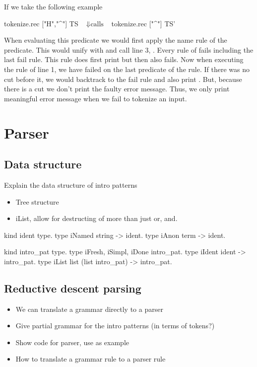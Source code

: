 \documentclass[thesis.tex]{subfiles}
\begin{document}
{If we take the following example
\begin{elpicode}
  tokenize.rec ["H","^"] TS
              ~$\Downarrow \text{calls}$~ 
  tokenize.rec ["^"] TS'
\end{elpicode}
When evaluating this predicate we would first apply the name rule of the  predicate. This would unify  with \elpiinline{[tName "H" | TS']} and call line 3, . Every rule of  fails including the last fail rule. This rule does first print  but then also fails. Now when executing the rule of line 1, we have failed on the last predicate of the rule. If there was no cut before it, we would backtrack to the fail rule and also print . But, because there is a cut we don't print the faulty error message. Thus, we only print meaningful error message when we fail to tokenize an input.

\section{Parser}\label{ssec:parser}

\subsection{Data structure}
Explain the data structure of intro patterns
\begin{itemize}
  \item Tree structure
  \item iList, allow for destructing of more than just or, and.
\end{itemize}

\begin{elpicode}
  kind ident type.
  type iNamed string -> ident.
  type iAnon term -> ident.

  kind intro_pat type.
  type iFresh, iSimpl, iDone intro_pat.
  type iIdent ident -> intro_pat.
  type iList list (list intro_pat) -> intro_pat.
\end{elpicode}

\subsection{Reductive descent parsing}
\begin{itemize}
  \item We can translate a grammar directly to a parser
  \item Give partial grammar for the intro patterns (in terms of tokens?)
  \item Show code for parser, use  as example
  \item How to translate a grammar rule to a parser rule
\end{itemize}

}
\end{document}
